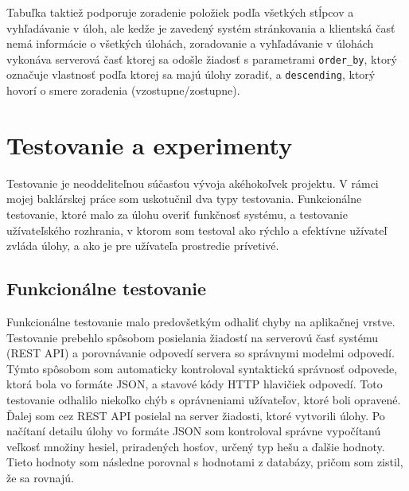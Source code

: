 \documentclass[slovak]{fitthesis}
\begin{document}
Tabuľka taktiež podporuje zoradenie položiek podľa všetkých stĺpcov a vyhľadávanie v úloh, ale kedže je zavedený systém stránkovania a klientská časť nemá informácie o všetkých úlohách, zoradovanie a vyhľadávanie v úlohách vykonáva serverová časť ktorej sa odošle žiadosť s parametrami \texttt{order\_by}, ktorý označuje vlastnosť podľa ktorej sa majú úlohy zoradiť, a \texttt{descending}, ktorý hovorí o smere zoradenia (vzostupne/zostupne).



\chapter{Testovanie a experimenty}
Testovanie je neoddeliteľnou súčasťou vývoja akéhokoľvek projektu. V rámci mojej baklárskej práce som uskotučnil dva typy testovania. Funkcionálne testovanie, ktoré malo za úlohu overiť funkčnosť systému, a testovanie užívateľského rozhrania, v ktorom som testoval ako rýchlo a efektívne užívateľ zvláda úlohy, a ako je pre užívateľa  prostredie prívetivé.

\section{Funkcionálne testovanie}
Funkcionálne testovanie malo predovšetkým odhaliť chyby na aplikačnej vrstve. Testovanie prebehlo spôsobom posielania žiadostí na serverovú časť systému (REST API) a porovnávanie odpovedí servera so správnymi modelmi odpovedí. Týmto spôsobom som automaticky kontroloval syntaktickú správnosť odpovede, ktorá bola vo formáte JSON, a stavové kódy HTTP hlavičiek odpovedí. Toto testovanie odhalilo niekoľko chýb s oprávneniami užívateľov, ktoré boli opravené. Ďalej som cez REST API posielal na server žiadosti, ktoré vytvorili úlohy. Po načítaní detailu úlohy vo formáte JSON som kontroloval správne vypočítanú veľkosť množiny hesiel, priradených hosťov, určený typ hešu a ďalšie hodnoty. Tieto hodnoty som následne porovnal s hodnotami z databázy, pričom som zistil, že sa rovnajú.
\end{document}
